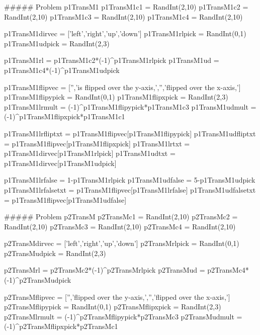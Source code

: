\documentclass{ximera}
\begin{document}
\begin{MCQuestions}



\begin{sagesilent}

##### Problem p1TransM1
p1TransM1c1 = RandInt(2,10)
p1TransM1c2 = RandInt(2,10)
p1TransM1c3 = RandInt(2,10)
p1TransM1c4 = RandInt(2,10)

p1TransM1dirvec = ['left','right','up','down']
p1TransM1rlpick = RandInt(0,1)
p1TransM1udpick = RandInt(2,3)

p1TransM1rl = p1TransM1c2*(-1)^p1TransM1rlpick
p1TransM1ud = p1TransM1c4*(-1)^p1TransM1udpick

p1TransM1flipvec = ['','is flipped over the y-axis,','','flipped over the x-axis,']
p1TransM1flipypick = RandInt(0,1)
p1TransM1flipxpick = RandInt(2,3)
p1TransM1lrmult = (-1)^p1TransM1flipypick*p1TransM1c3
p1TransM1udmult = (-1)^p1TransM1flipxpick*p1TransM1c1

p1TransM1lrfliptxt = p1TransM1flipvec[p1TransM1flipypick]
p1TransM1udfliptxt = p1TransM1flipvec[p1TransM1flipxpick]
p1TransM1lrtxt = p1TransM1dirvec[p1TransM1rlpick]
p1TransM1udtxt = p1TransM1dirvec[p1TransM1udpick]

p1TransM1lrfalse = 1-p1TransM1rlpick
p1TransM1udfalse = 5-p1TransM1udpick
p1TransM1lrfalsetxt = p1TransM1flipvec[p1TransM1lrfalse]
p1TransM1udfalsetxt = p1TransM1flipvec[p1TransM1udfalse]


##### Problem p2TransM
p2TransMc1 = RandInt(2,10)
p2TransMc2 = RandInt(2,10)
p2TransMc3 = RandInt(2,10)
p2TransMc4 = RandInt(2,10)

p2TransMdirvec = ['left','right','up','down']
p2TransMrlpick = RandInt(0,1)
p2TransMudpick = RandInt(2,3)

p2TransMrl = p2TransMc2*(-1)^p2TransMrlpick
p2TransMud = p2TransMc4*(-1)^p2TransMudpick

p2TransMflipvec = ['','flipped over the y-axis,','','flipped over the x-axis,']
p2TransMflipypick = RandInt(0,1)
p2TransMflipxpick = RandInt(2,3)
p2TransMlrmult = (-1)^p2TransMflipypick*p2TransMc3
p2TransMudmult = (-1)^p2TransMflipxpick*p2TransMc1


\end{sagesilent}
\end{MCQuestions}
\end{document}

